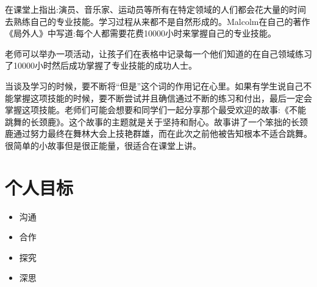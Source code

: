    \par
   在课堂上指出:演员、音乐家、运动员等所有在特定领域的人们都会花大量的时间去熟练自己的专业技能。学习过程从来都不是自然形成的。Malcolm在自己的著作《局外人》中写道:每个人都需要花费10000小时来掌握自己的专业技能。\par
   老师可以举办一项活动，让孩子们在表格中记录每一个他们知道的在自己领域练习了10000小时然后成功掌握了专业技能的成功人士。\par
   
   \begin{note}
     当谈及学习的时候，要不断将“但是”这个词的作用记在心里。如果有学生说自己不能掌握这项技能的时候，要不断尝试并且确信通过不断的练习和付出，最后一定会掌握这项技能。老师们可能会想要和同学们一起分享那个最受欢迎的故事:《不能跳舞的长颈鹿》。这个故事的主题就是关于坚持和耐心。故事讲了一个笨拙的长颈鹿通过努力最终在舞林大会上技艳群雄，而在此次之前他被告知根本不适合跳舞。很简单的小故事但是很正能量，很适合在课堂上讲。
   \end{note}  

\section{个人目标}
   \begin{itemize}
      \item 沟通
      \item 合作
      \item 探究
      \item 深思
   \end{itemize}  

